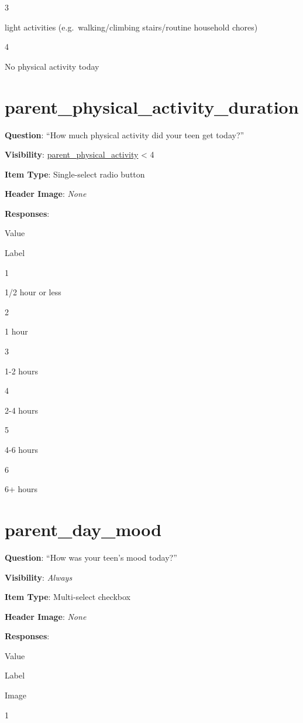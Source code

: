 \documentclass[]{book}
\begin{document}
3

light activities (e.g.~walking/climbing stairs/routine household chores)

4

No physical activity today

\hypertarget{parent_physical_activity_duration}{%
\section{parent\_physical\_activity\_duration}\label{parent_physical_activity_duration}}

\textbf{Question}: ``How much physical activity did your teen get today?''

\textbf{Visibility}: \protect\hyperlink{parent_physical_activity}{parent\_physical\_activity} \textless{} 4

\textbf{Item Type}: Single-select radio button

\textbf{Header Image}: \emph{None}

\textbf{Responses}:

Value

Label

1

1/2 hour or less

2

1 hour

3

1-2 hours

4

2-4 hours

5

4-6 hours

6

6+ hours

\hypertarget{parent_day_mood}{%
\section{parent\_day\_mood}\label{parent_day_mood}}

\textbf{Question}: ``How was your teen's mood today?''

\textbf{Visibility}: \emph{Always}

\textbf{Item Type}: Multi-select checkbox

\textbf{Header Image}: \emph{None}

\textbf{Responses}:

Value

Label

Image

1
\end{document}
